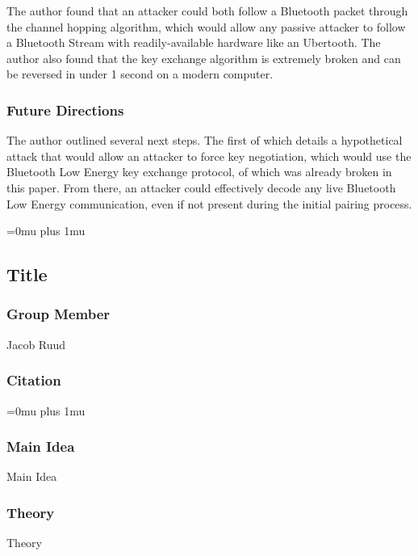 \noindent
The author found that an attacker could both follow a Bluetooth packet through the channel hopping algorithm, which would allow any passive attacker to follow a Bluetooth Stream with readily-available hardware like an Ubertooth.  The author also found that the key exchange algorithm is extremely broken and can be reversed in under 1 second on a modern computer.

\subsubsection{Future Directions}

\noindent
The author outlined several next steps.  The first of which details a hypothetical attack that would allow an attacker to force key negotiation, which would use the Bluetooth Low Energy key exchange protocol, of which was already broken in this paper.  From there, an attacker could effectively decode any live Bluetooth Low Energy communication, even if not present during the initial pairing process.

\Urlmuskip=0mu plus 1mu\relax

\noindent
\subsection{Title}

\subsubsection{Group Member}

\noindent
Jacob Ruud
\noindent
\subsubsection{Citation}

\Urlmuskip=0mu plus 1mu\relax

\subsubsection{Main Idea}

\noindent
Main Idea

\subsubsection{Theory}

\noindent
Theory


